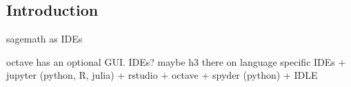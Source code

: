
\subsection{Introduction}

sagemath as IDEs

octave has an optional GUI. IDEs? maybe h3 there on language specific IDEs
+ jupyter (python, R, julia)
+ rstudio
+ octave
+ spyder (python)
+ IDLE

